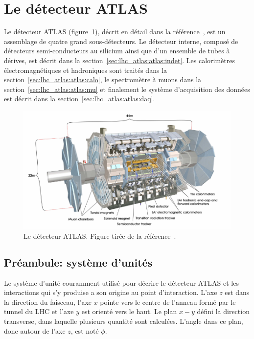 \section{Le détecteur ATLAS}
\label{sec:lhc_atlas:atlas}

Le détecteur ATLAS (figure~\ref{fig:atlas}), décrit en détail dans la
référence~\cite{collaboration_atlas_2008}, est un assemblage de quatre
grand sous-détecteurs. Le détecteur interne, composé de détecteurs
semi-conducteurs au silicium ainsi que d'un ensemble de tubes à
dérives, est décrit dans la
section~\ref{sec:lhc_atlas:atlas:indet}. Les calorimètres
électromagnétiques et hadroniques sont traités dans la
section~\ref{sec:lhc_atlas:atlas:calo}, le spectromètre à muons dans
la section~\ref{sec:lhc_atlas:atlas:mu} et finalement le système
d'acquisition des données est décrit dans la
section~\ref{sec:lhc_atlas:atlas:daq}.

\begin{figure}[h]
  \centering
  \includegraphics{atlas.pdf}
  \caption{Le détecteur ATLAS. Figure tirée de la référence~\cite{collaboration_atlas_2008}.}
  \label{fig:atlas}
\end{figure}

\subsection{Préambule: système d'unités}
\label{sec:units}

Le système d'unité couramment utilisé pour décrire le détecteur ATLAS
et les interactions qui s'y produise a son origine au point
d'interaction. L'axe $z$ est dans la direction du faisceau, l'axe $x$
pointe vers le centre de l'anneau formé par le tunnel du LHC et l'axe
$y$ est orienté vers le haut. Le plan $x-y$ défini la direction
transverse, dans laquelle plusieurs quantité sont calculées. L'angle
dans ce plan, donc autour de l'axe $z$, est noté $\phi$.

